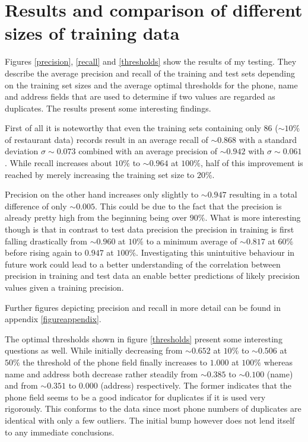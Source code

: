 \documentclass[conference]{IEEEtran}
\newcommand{\unsim}{\mathord{\sim}}
\begin{document}
\section{Results and comparison of different sizes of training data}\label{comparison}
Figures \ref{precision}, \ref{recall} and \ref{thresholds} show the results of my testing. They describe the average precision and recall of the training and test sets depending on the training set sizes and the average optimal thresholds for the phone, name and address fields that are used to determine if two values are regarded as duplicates.
The results present some interesting findings.



First of all it is noteworthy that even the training sets containing only $86$ ($\unsim10\%$ of restaurant data) records result in an average recall of $\unsim0.868$ with a standard deviation $\sigma\sim0.073$ combined with an average precision of $\unsim0.942$ with $\sigma\sim0.061$. While recall increases about $10\%$ to $\unsim0.964$ at $100\%$, half of this improvement is reached by merely increasing the training set size to $20\%$.

Precision on the other hand increases only slightly to $\unsim0.947$ resulting in a total difference of only  $\unsim0.005$. This could be due to the fact that the precision is already pretty high from the beginning being over $90\%$. What is more interesting though is that in contrast to test data precision the precision in training is first falling drastically from $\unsim0.960$ at $10\%$ to a minimum average of $\unsim0.817$ at $60\%$ before rising again to $0.947$ at $100\%$. Investigating this unintuitive behaviour in future work could lead to a better understanding of the correlation between precision in training and test data an enable better predictions of likely precision values given a training precision.

Further figures depicting precision and recall in more detail can be found in appendix \ref{figureappendix}.



The optimal thresholds shown in figure \ref{thresholds} present some interesting questions as well. While initially decreasing from $\unsim0.652$ at $10\%$ to $\unsim0.506$ at $50\%$ the threshold of the phone field finally increases to $1.000$ at $100\%$ whereas name and address both decrease rather steadily from $\unsim0.385$ to $\unsim0.100$ (name) and from  $\unsim0.351$ to $0.000$ (address) respectively. The former indicates that the phone field seems to be a good indicator for duplicates if it is used very rigorously. This conforms to the data since most phone numbers of duplicates are identical with only a few outliers. The initial bump however does not lend itself to any immediate conclusions.
\end{document}

